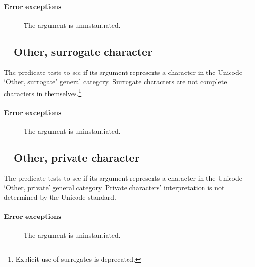 \paragraph{Error exceptions}
\begin{description}
\item[]
The argument is uninstantiated.
\end{description}

\subsection{ -- Other, surrogate character}
\label{chars:isCsChar}

The  predicate tests to see if its  argument represents a character in the Unicode `Other, surrogate' general category. Surrogate characters are not complete characters in themselves.\footnote{Explicit use of surrogates is deprecated.}
        
\paragraph{Error exceptions}
\begin{description}
\item[]
The argument is uninstantiated.
\end{description}

\subsection{ -- Other, private character}
\label{chars:isCoChar}

The  predicate tests to see if its  argument represents a character in the Unicode `Other, private' general category. Private characters' interpretation is not determined by the Unicode standard.
        
\paragraph{Error exceptions}
\begin{description}
\item[]
The argument is uninstantiated.
\end{description}


